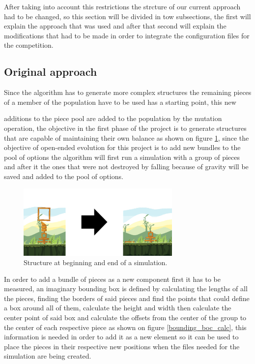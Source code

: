 \documentclass[conference]{IEEEtran}
\begin{document}
After taking into account this restrictions the strcture of our current approach
had to be changed, so this section will be divided in tow subsections, the first
will explain the approach that was used and after that second will explain the
modifications that had to be made in order to integrate the configuration files
for the competition. 

\subsection{Original approach}
Since the algorithm has to generate more complex structures the remaining pieces
of a member of the population have to be used has a starting point, this new

additions to the piece pool are added to the population by the mutation
operation, the objective in the first phase of the project is to generate
structures that are capable of maintaining their own balance as shown on figure
\ref{test_old}, since the objective of open-ended evolution for this project is
to add new bundles to the pool of options the algorithm will first run a
simulation with a group of pieces and after it the ones that were not destroyed
by falling because of gravity will be saved and added to the pool of options.



\begin{figure}[htbp]
\centerline{\includegraphics[width=80mm]{Images/simulation_bef_aft_example.png}}
\caption{Structure at beginning and end of a simulation.}
\label{test_old}
\end{figure}

In order to add a bundle of pieces as a new component first it has to be
measured, an imaginary bounding box is defined by calculating the lengths of all
the pieces, finding the borders of said pieces and find the points that could
define a box around all of them, calculate the height and width then calculate
the center point of said box and calculate the offsets from the center of the
group to the center of each respective piece as shown on figure
\ref{bounding_boc_calc}, this information is needed in order to add it as a new
element so it can be used to place the pieces in their respective new positions
when the files needed for the simulation are being created.
\end{document}
